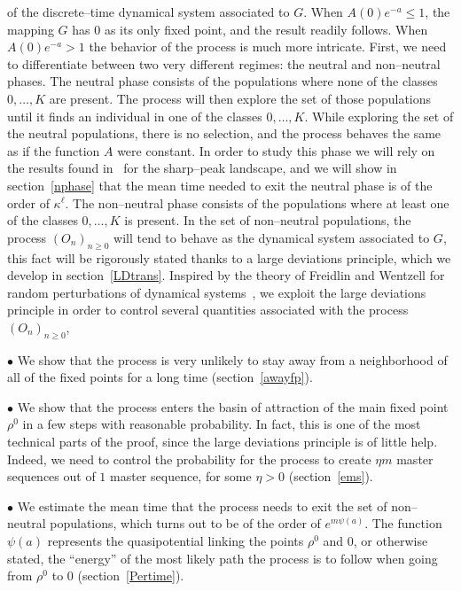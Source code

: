 \documentclass[a4paper,12pt]{article}
\theoremstyle{definition}
\theoremstyle{remark}
\def \k {\kappa}
\def \Ot {(O_n)_{n\geq 0}}
\def \exa {e^{-a}}
\begin{document}
of the discrete--time dynamical system associated to $G$.
When $A(0)\exa\leq 1$, the mapping $G$ has 0 as its only fixed point,
and the result readily follows. 
When $A(0)\exa>1$ the behavior of the process is much more intricate.
First, we need to differentiate between two very different regimes:
the neutral and non--neutral phases.
The neutral phase consists of the populations where none of the classes $0,\dots,K$
are present. The process will then explore the set of those populations 
until it finds an individual in one of the classes $0,\dots,K$.
While exploring the set of the neutral populations, 
there is no selection, and the process behaves the same as if the function
$A$ were constant. In order to study this phase we will rely on the results found in~\cite{CerfWF}
for the sharp--peak landscape, and we will show in section~\ref{nphase} 
that the mean time needed to exit
the neutral phase is of the order of $\k^\ell$.
The non--neutral phase consists of the populations where at least one of the classes
$0,\dots,K$ is present. 
In the set of non--neutral populations, the process $\Ot$ will tend to behave
as the dynamical system associated to $G$, this fact will be rigorously stated
thanks to a large deviations principle, which we develop in section~\ref{LDtrans}.
Inspired by the theory of Freidlin and Wentzell for random perturbations
of dynamical systems~\cite{FW}, we exploit the large deviations principle
in order to control several quantities associated with the process $\Ot$,

$\bullet$ We show that the process is very unlikely to stay away 
from a neighborhood of all of the fixed points for a long time (section~\ref{awayfp}).

$\bullet$ We show that the process enters the basin of attraction of 
the main fixed point $\rho^0$ in a few steps with reasonable probability.
In fact, this is one of the most technical parts of the proof,
since the large deviations principle is of little help. Indeed, we need to
control the probability for the process to create $\eta m$ master sequences
out of $1$ master sequence, for some $\eta>0$ (section~\ref{ems}).

$\bullet$ We estimate the mean time that the process needs to exit 
the set of non--neutral populations, which turns out to be of the order of $e^{m\psi(a)}$.
The function $\psi(a)$ represents the quasipotential linking the points $\rho^0$ and $0$,
or otherwise stated, the ``energy'' of the most likely path the process is to follow
when going from $\rho^0$ to $0$ (section~\ref{Pertime}).
\end{document}
